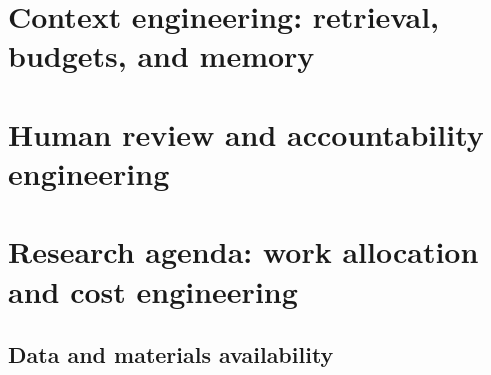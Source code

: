 \documentclass[11pt,oneside]{book}
\newcommand{\currentparttitle}{}
\begin{document}










\part{Context engineering: retrieval, budgets, and memory}
\gdef\currentparttitle{Part IV: Context}









\part{Human review and accountability engineering}
\gdef\currentparttitle{Part V: Human review}





\part{Research agenda: work allocation and cost engineering}
\gdef\currentparttitle{Part VI: Research agenda}





\gdef\currentparttitle{Closing}


\clearpage
\appendix
\gdef\currentparttitle{Appendix}


\backmatter
{}
\gdef\currentparttitle{}

\renewcommand{\bibname}{References}


\chapter*{Data and materials availability}

\end{document}
